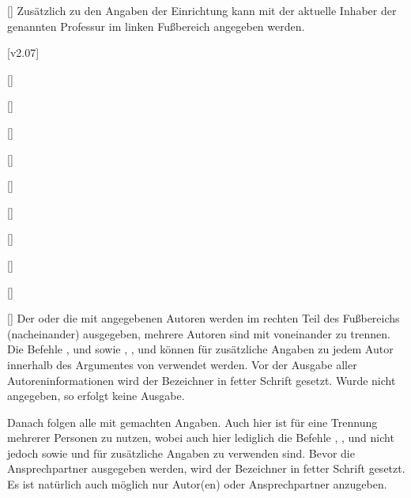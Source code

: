 \begin{Bundle*}[v2.05]{}
\begin{Declaration}{[]}
\printdeclarationlist%
%
Zusätzlich zu den Angaben der Einrichtung kann mit  der 
aktuelle Inhaber der genannten Professur im linken Fußbereich angegeben werden.
\end{Declaration}

[v2.07]
\begin{Declaration}{[]}
\begin{Declaration}{[]}
\begin{Declaration}{[]}
\begin{Declaration}{[]}
\begin{Declaration}{[]}
\begin{Declaration}{[]}
\begin{Declaration}{[]}
\begin{Declaration}{[]}
\begin{Declaration}{%
  []%
}
\begin{Declaration}{[]}
\printdeclarationlist%
%
Der oder die mit  angegebenen Autoren werden im rechten Teil des 
Fußbereichs (nacheinander) ausgegeben, mehrere Autoren sind mit  
voneinander zu trennen. Die Befehle ,  und 
 sowie , ,  und 
 können für zusätzliche Angaben zu jedem Autor innerhalb 
des Argumentes von  verwendet werden. Vor der Ausgabe aller 
Autoreninformationen wird der Bezeichner  in fetter Schrift 
gesetzt. Wurde  nicht angegeben, so erfolgt keine Ausgabe. 

Danach folgen alle mit  gemachten Angaben. Auch hier ist 
 für eine Trennung mehrerer Personen zu nutzen, wobei auch hier 
lediglich die Befehle , ,  und 
 nicht jedoch  sowie  und 
 für zusätzliche Angaben zu verwenden sind. Bevor die 
Ansprechpartner ausgegeben werden, wird der Bezeichner  
in fetter Schrift gesetzt. Es ist natürlich auch möglich nur Autor(en) oder 
Ansprechpartner anzugeben.


\end{Declaration}
\end{Declaration}
\end{Declaration}
\end{Declaration}
\end{Declaration}
\end{Declaration}
\end{Declaration}
\end{Declaration}
\end{Declaration}
\end{Declaration}
\end{Bundle*}
